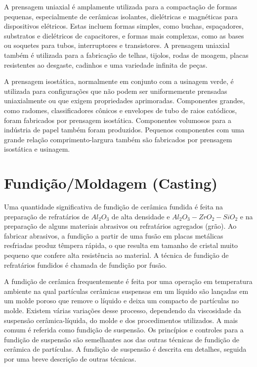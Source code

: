A prensagem uniaxial é amplamente utilizada para a compactação de formas pequenas, especialmente de cerâmicas isolantes, dielétricas e magnéticas para dispositivos elétricos. Estas incluem formas simples, como buchas, espaçadores, substratos e dielétricos de capacitores, e formas mais complexas, como as bases ou soquetes para tubos, interruptores e transistores. A prensagem uniaxial também é utilizada para a fabricação de telhas, tijolos, rodas de moagem, placas resistentes ao desgaste, cadinhos e uma variedade infinita de peças.

A prensagem isostática, normalmente em conjunto com a usinagem verde, é utilizada para configurações que não podem ser uniformemente prensadas uniaxialmente ou que exigem propriedades aprimoradas. Componentes grandes, como radomes, classificadores cônicos e envelopes de tubo de raios catódicos, foram fabricados por prensagem isostática. Componentes volumosos para a indústria de papel também foram produzidos. Pequenos componentes com uma grande relação comprimento-largura também são fabricados por prensagem isostática e usinagem.

\section*{Fundição/Moldagem (Casting)}

Uma quantidade significativa de fundição de cerâmica fundida é feita na preparação de refratários de $Al_2O_3$ de alta densidade e $Al_2O_3-ZrO_2-SiO_2$ e na preparação de alguns materiais abrasivos ou refratários agregados (grão). Ao fabricar abrasivos, a fundição a partir de uma fusão em placas metálicas resfriadas produz têmpera rápida, o que resulta em tamanho de cristal muito pequeno que confere alta resistência ao material. A técnica de fundição de refratários fundidos é chamada de fundição por fusão.

A fundição de cerâmica frequentemente é feita por uma operação em temperatura ambiente na qual partículas cerâmicas suspensas em um líquido são lançadas em um molde poroso que remove o líquido e deixa um compacto de partículas no molde. Existem várias variações desse processo, dependendo da viscosidade da suspensão cerâmica-líquida, do molde e dos procedimentos utilizados. A mais comum é referida como fundição de suspensão. Os princípios e controles para a fundição de suspensão são semelhantes aos das outras técnicas de fundição de cerâmica de partículas. A fundição de suspensão é descrita em detalhes, seguida por uma breve descrição de outras técnicas.


